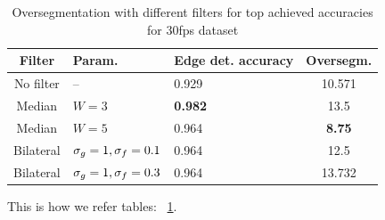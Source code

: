 \begin{table}
\caption{Oversegmentation with different filters for top achieved accuracies for 30fps dataset}
\label{tb:oversegment}
\centering
\begin{tabular}{ | c | p{16mm} | p{16mm} | c | }
\hline
\textbf{Filter} & \textbf{Param.} & \textbf{Edge det. \newline accuracy} & \textbf{Oversegm.} \\
\hline
No filter & -- & 0.929 & 10.571 \\
\hline
Median & $W=3$ & \textbf{0.982} & 13.5 \\
\hline
Median & $W=5$ & 0.964 & \textbf{8.75} \\
\hline
Bilateral & ${\sigma}_{g}=1,\\ {\sigma}_{f}=0.1$ & 0.964 & 12.5 \\
\hline
Bilateral & ${\sigma}_{g}=1,\\ {\sigma}_{f}=0.3$ & 0.964 & 13.732 \\
\hline
\end{tabular}
\end{table}

This is how we refer tables: ~\ref{tb:oversegment}.